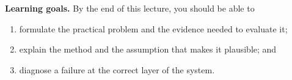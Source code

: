 \documentclass[
  fontsize=10pt,
  twoside=false,
  secnumdepth=2,
  numbers=noenddot,
  fontmethod=modern
]{kaohandt}
\title[\LectureTitle]{\textcolor{LectureInk}{\LectureTitle}}
\subtitle{\LectureSubtitle}
\author[Learn ML by Building]{}
\date{}
\begin{document}
\maketitle
\pagestyle{pagenum.scrheadings}
\thispagestyle{pagenum.scrheadings}

\begin{abstract}
\noindent
\LectureAbstract
\end{abstract}

\begin{widepar}
\begin{learningbox}
\textbf{Learning goals.} By the end of this lecture, you should be able to
\begin{enumerate}[label=\textcolor{LectureTeal}{\arabic*.}, leftmargin=1.8em, itemsep=0.15em]
  \item formulate the practical problem and the evidence needed to evaluate it;
  \item explain the method and the assumption that makes it plausible; and
  \item diagnose a failure at the correct layer of the system.
\end{enumerate}
\end{learningbox}
\end{widepar}



\end{document}
